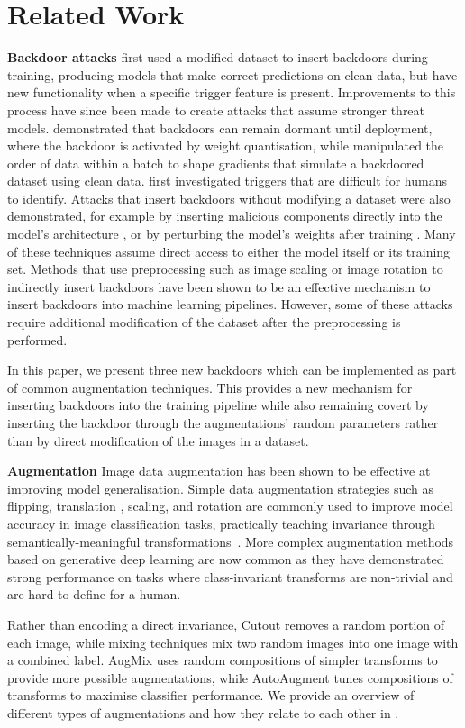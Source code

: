 \section{Related Work}

\textbf{Backdoor attacks} \cite{badnet} first used a modified dataset to insert backdoors during training, producing models that make correct predictions on clean data, but have new functionality when a specific trigger feature is present. Improvements to this process have since been made to create attacks that assume stronger threat models. \cite{quantisationbackdoor} demonstrated that backdoors can remain dormant until deployment, where the backdoor is activated by weight quantisation, while \cite{bob} manipulated the order of data within a batch to shape gradients that simulate a backdoored dataset using clean data. \cite{invisiblebackdoor} first investigated triggers that are difficult for humans to identify. Attacks that insert backdoors without modifying a dataset were also demonstrated, for example by inserting malicious components directly into the model's architecture \citep{architecturebackdoor}, or by perturbing the model's weights after training \citep{weightattack}. Many of these techniques assume direct access to either the model itself or its training set. Methods that use preprocessing such as image scaling \citep{imagescaling0, imagescaling1} or image rotation \citep{rotatebackdoor} to indirectly insert backdoors have been shown to be an effective mechanism to insert backdoors into machine learning pipelines. However, some of these attacks require additional modification of the dataset after the preprocessing is performed.

In this paper, we present three new backdoors which can be implemented as part of common augmentation techniques. This provides a new mechanism for inserting backdoors into the training pipeline while also remaining covert by inserting the backdoor through the augmentations' random parameters rather than by direct modification of the images in a dataset.

\textbf{Augmentation} Image data augmentation has been shown to be effective at improving model generalisation. Simple data augmentation strategies such as flipping, translation \citep{resnet, translation2}, scaling, and rotation \citep{rotation} are commonly used to improve model accuracy in image classification tasks, practically teaching invariance through semantically-meaningful transformations~\citep{lyle2020benefits}. More complex augmentation methods based on generative deep learning \citep{dagan, cyclegan} are now common as they have demonstrated strong performance on tasks where class-invariant transforms are non-trivial and are hard to define for a human.

Rather than encoding a direct invariance, Cutout \citep{cutout} removes a random portion of each image, while mixing techniques \citep{cutmix, mixup} mix two random images into one image with a combined label. AugMix \citep{augmix} uses random compositions of simpler transforms to provide more possible augmentations, while AutoAugment \citep{autoaug} tunes compositions of transforms to maximise classifier performance. We provide an overview of different types of augmentations and how they relate to each other in .